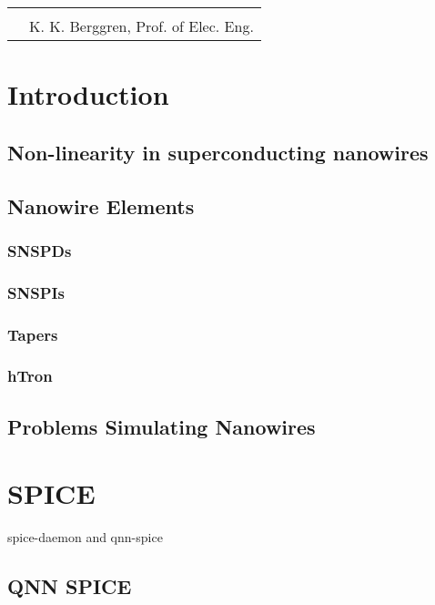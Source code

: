 \documentclass{article}
\begin{document}
\vspace{15 mm}
\begin{tabular}{@{}p{1.5in}p{4in}@{}}
  & \hrulefill \\
& K. K. Berggren, Prof. of Elec. Eng.
\end{tabular}

\newpage

\tableofcontents

\section{Introduction}

\subsection{Non-linearity in superconducting nanowires}

\subsection{Nanowire Elements}

\subsubsection{SNSPDs}

\subsubsection{SNSPIs}

\subsubsection{Tapers}

\subsubsection{hTron}

\subsection{Problems Simulating Nanowires}

\section{SPICE}

spice-daemon and qnn-spice

\subsection{QNN SPICE}
\end{document}
